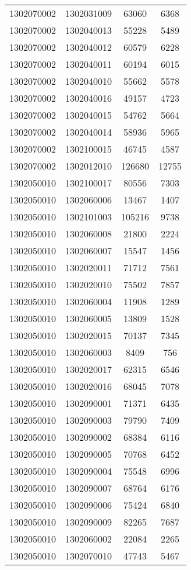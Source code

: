 \begin{longtable}{llcc}
1302070002 & 1302031009 & 63060 & 6368\\
1302070002 & 1302040013 & 55228 & 5489\\
1302070002 & 1302040012 & 60579 & 6228\\
1302070002 & 1302040011 & 60194 & 6015\\
1302070002 & 1302040010 & 55662 & 5578\\
1302070002 & 1302040016 & 49157 & 4723\\
1302070002 & 1302040015 & 54762 & 5664\\
1302070002 & 1302040014 & 58936 & 5965\\
1302070002 & 1302100015 & 46745 & 4587\\
1302070002 & 1302012010 & 126680 & 12755\\
1302050010 & 1302100017 & 80556 & 7303\\
1302050010 & 1302060006 & 13467 & 1407\\
1302050010 & 1302101003 & 105216 & 9738\\
1302050010 & 1302060008 & 21800 & 2224\\
1302050010 & 1302060007 & 15547 & 1456\\
1302050010 & 1302020011 & 71712 & 7561\\
1302050010 & 1302020010 & 75502 & 7857\\
1302050010 & 1302060004 & 11908 & 1289\\
1302050010 & 1302060005 & 13809 & 1528\\
1302050010 & 1302020015 & 70137 & 7345\\
1302050010 & 1302060003 & 8409 & 756\\
1302050010 & 1302020017 & 62315 & 6546\\
1302050010 & 1302020016 & 68045 & 7078\\
1302050010 & 1302090001 & 71371 & 6435\\
1302050010 & 1302090003 & 79790 & 7409\\
1302050010 & 1302090002 & 68384 & 6116\\
1302050010 & 1302090005 & 70768 & 6452\\
1302050010 & 1302090004 & 75548 & 6996\\
1302050010 & 1302090007 & 68764 & 6176\\
1302050010 & 1302090006 & 75424 & 6840\\
1302050010 & 1302090009 & 82265 & 7687\\
1302050010 & 1302060002 & 22084 & 2265\\
1302050010 & 1302070010 & 47743 & 5467\\

\end{longtable}
